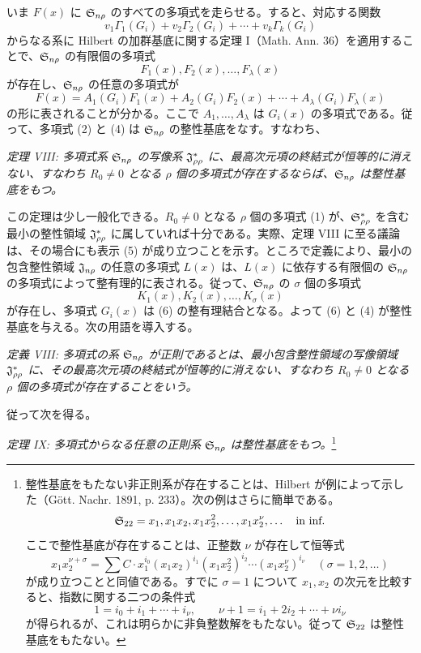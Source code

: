 \documentclass[11pt]{jlreq}
\begin{document}
いま $F(x)$ に $\mathfrak{S}_{n\rho}$ のすべての多項式を走らせる。すると、対応する関数
\[
  v_1\Gamma_1(G_i)+v_2\Gamma_2(G_i)+\cdots+v_k\Gamma_k(G_i)
\]
からなる系に Hilbert の加群基底に関する定理 I（Math. Ann. 36）を適用することで、$\mathfrak{S}_{n\rho}$ の有限個の多項式
\begin{equation}
  F_1(x),F_2(x),\ldots,F_\lambda(x)
\tag{4}
\end{equation}
が存在し、$\mathfrak{S}_{n\rho}$ の任意の多項式が
\begin{equation}
  F(x)=A_1(G_i)F_1(x)+A_2(G_i)F_2(x)+\cdots+A_\lambda(G_i)F_\lambda(x)
\tag{5}
\end{equation}
の形に表されることが分かる。ここで $A_1,\ldots,A_\lambda$ は $G_i(x)$ の多項式である。従って、多項式 (2) と (4) は $\mathfrak{S}_{n\rho}$ の整性基底をなす。すなわち、

\emph{定理 VIII: 多項式系 $\mathfrak{S}_{n\rho}$ の写像系 $\mathfrak{J}^*_{\rho\rho}$ に、最高次元項の終結式が恒等的に消えない、すなわち $R_0\ne0$ となる $\rho$ 個の多項式が存在するならば、$\mathfrak{S}_{n\rho}$ は整性基底をもつ。}

この定理は少し一般化できる。$R_0\ne0$ となる $\rho$ 個の多項式 (1) が、$\mathfrak{S}^*_{\rho\rho}$ を含む最小の整性領域 $\mathfrak{J}^*_{\rho\rho}$ に属していれば十分である。実際、定理 VIII に至る議論は、その場合にも表示 (5) が成り立つことを示す。ところで定義により、最小の包含整性領域 $\mathfrak{J}_{n\rho}$ の任意の多項式 $L(x)$ は、$L(x)$ に依存する有限個の $\mathfrak{S}_{n\rho}$ の多項式によって整有理的に表される。従って、$\mathfrak{S}_{n\rho}$ の $\sigma$ 個の多項式
\begin{equation}
  K_1(x),K_2(x),\ldots,K_\sigma(x)
\tag{6}
\end{equation}
が存在し、多項式 $G_i(x)$ は (6) の整有理結合となる。よって (6) と (4) が整性基底を与える。次の用語を導入する。

\emph{定義 VIII: 多項式の系 $\mathfrak{S}_{n\rho}$ が正則であるとは、最小包含整性領域の写像領域 $\mathfrak{J}^*_{\rho\rho}$ に、その最高次元項の終結式が恒等的に消えない、すなわち $R_0\ne0$ となる $\rho$ 個の多項式が存在することをいう。}

従って次を得る。

\emph{定理 IX: 多項式からなる任意の正則系 $\mathfrak{S}_{n\rho}$ は整性基底をもつ。}\footnote{整性基底をもたない非正則系が存在することは、Hilbert が例によって示した（Gött. Nachr. 1891, p. 233）。次の例はさらに簡単である。
\[
  \mathfrak{S}_{22}=x_1,
  x_1x_2,
  x_1x_2^2,
  \ldots,
  x_1x_2^\nu,
  \ldots\quad\text{in inf.}
\]
ここで整性基底が存在することは、正整数 $\nu$ が存在して恒等式
\[
  x_1x_2^{\nu+\sigma}=\sum C\cdot x_1^{i_0}(x_1x_2)^{i_1}(x_1x_2^2)^{i_2}\cdots(x_1x_2^\nu)^{i_\nu}
  \quad(\sigma=1,2,\ldots)
\]
が成り立つことと同値である。すでに $\sigma=1$ について $x_1,x_2$ の次元を比較すると、指数に関する二つの条件式
\[
  1=i_0+i_1+\cdots+i_\nu,
  \qquad
  \nu+1=i_1+2i_2+\cdots+\nu i_\nu
\]
が得られるが、これは明らかに非負整数解をもたない。従って $\mathfrak{S}_{22}$ は整性基底をもたない。}
\end{document}
